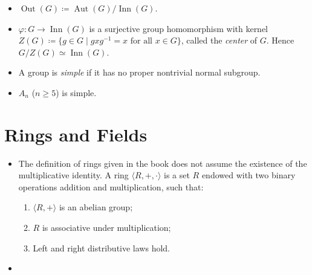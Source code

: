 \documentclass{article}
\newcommand{\aut}{\operatorname{Aut}}
\newcommand{\inn}{\operatorname{Inn}}
\renewcommand{\phi}{\varphi}
\begin{document}
\begin{itemize}
    \item $\operatorname{Out}(G) \coloneqq \aut(G)/\inn(G)$.
    \item $\phi: G \to \inn(G)$ is a surjective group homomorphism with kernel $Z(G) \coloneqq \{g \in G \mid g x g^{-1} = x \text{ for all } x \in G\}$, called the \textit{center} of $G$. Hence $G/Z(G) \simeq \inn(G)$.
    \item A group is \textit{simple} if it has no proper nontrivial normal subgroup.
    \item $A_n$ ($n \geq 5$) is simple.
\end{itemize}

\section{Rings and Fields}
\begin{itemize}
    \item The definition of rings given in the book does not assume the existence of the multiplicative identity. A ring $\langle R,+,\cdot \rangle$ is a set $R$ endowed with two binary operations addition and multiplication, such that:
    \begin{enumerate}%
        \item $\langle R, + \rangle$ is an abelian group;
        \item $R$ is associative under multiplication;
        \item Left and right distributive laws hold.
    \end{enumerate}
    \item 
\end{itemize}
\end{document}
